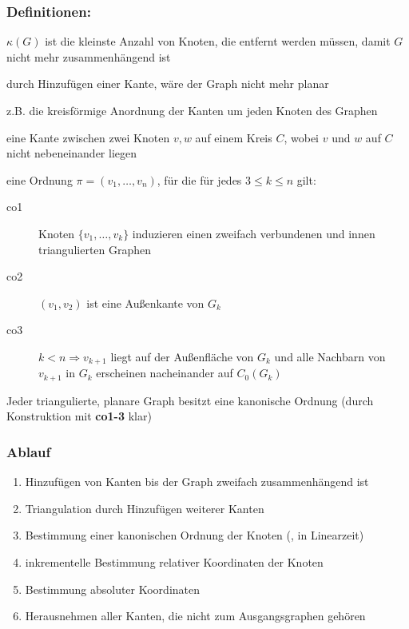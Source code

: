 \subsubsection{Definitionen:}
\begin{description}[itemsep=-1pt]
	\item[connectivity:] $\kappa(G)$ ist die kleinste Anzahl von Knoten, die entfernt werden müssen, damit $G$ nicht mehr zusammenhängend ist
	\item[maximal planar/trianguliert:] durch Hinzufügen einer Kante, wäre der Graph nicht mehr planar
	\item[kombinatorische Einbettung:] z.B. die kreisförmige Anordnung der Kanten um jeden Knoten des Graphen
	\item[chord:] eine Kante zwischen zwei Knoten $v,w$ auf einem Kreis $C$, wobei $v$ und $w$ auf $C$ nicht nebeneinander liegen
	\item[kanonische Ordnung:] eine Ordnung $\pi=(v_1,\dots,v_n)$, für die für jedes $3\leq k\leq n$ gilt:
		\begin{description}
			\item[co1] Knoten $\{v_1,\dots,v_k\}$ induzieren einen zweifach verbundenen und innen triangulierten Graphen
			\item[co2] $(v_1,v_2)$ ist eine Außenkante von $G_k$
			\item[co3] $k<n\Rightarrow v_{k+1}$ liegt auf der Außenfläche von $G_k$ und alle Nachbarn von $v_{k+1}$ in $G_k$ erscheinen nacheinander auf $C_0(G_k)$
		\end{description}
\end{description}
Jeder triangulierte, planare Graph besitzt eine kanonische Ordnung (durch Konstruktion mit \textbf{co1-3} klar)
\subsubsection{Ablauf}
\begin{enumerate}[itemsep=-1pt]
	\item Hinzufügen von Kanten bis der Graph zweifach zusammenhängend ist
	\item Triangulation durch Hinzufügen weiterer Kanten
	\item Bestimmung einer kanonischen Ordnung der Knoten (\algobreak{}, in Linearzeit)
	\item inkrementelle Bestimmung relativer Koordinaten der Knoten
	\item Bestimmung absoluter Koordinaten
	\item Herausnehmen aller Kanten, die nicht zum Ausgangsgraphen gehören
\end{enumerate}
